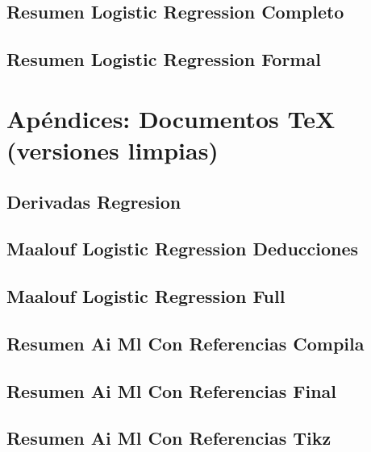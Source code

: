 \documentclass[
]{article}
\begin{document}
\subsection{Resumen Logistic Regression
Completo}\label{resumen-logistic-regression-completo}


\subsection{Resumen Logistic Regression
Formal}\label{resumen-logistic-regression-formal}


\section{Apéndices: Documentos TeX (versiones
limpias)}\label{apuxe9ndices-documentos-tex-versiones-limpias}

\subsection{Derivadas Regresion}\label{derivadas-regresion-1}



\subsection{Maalouf Logistic Regression
Deducciones}\label{maalouf-logistic-regression-deducciones-1}



\subsection{Maalouf Logistic Regression
Full}\label{maalouf-logistic-regression-full-1}



\subsection{Resumen Ai Ml Con Referencias
Compila}\label{resumen-ai-ml-con-referencias-compila-1}



\subsection{Resumen Ai Ml Con Referencias
Final}\label{resumen-ai-ml-con-referencias-final-1}



\subsection{Resumen Ai Ml Con Referencias
Tikz}\label{resumen-ai-ml-con-referencias-tikz-1}
\end{document}
